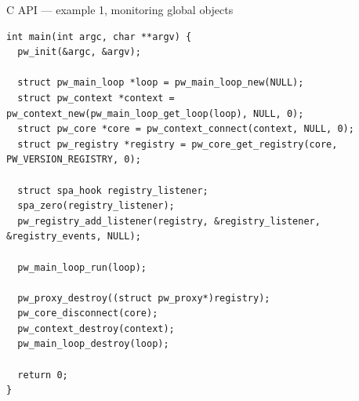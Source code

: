 \begin{frame}[fragile]{C API — example 1, monitoring global objects}
  \begin{block}{}
    \fontsize{8}{8}\selectfont
      \begin{verbatim}
int main(int argc, char **argv) {
  pw_init(&argc, &argv);

  struct pw_main_loop *loop = pw_main_loop_new(NULL);
  struct pw_context *context = pw_context_new(pw_main_loop_get_loop(loop), NULL, 0);
  struct pw_core *core = pw_context_connect(context, NULL, 0);
  struct pw_registry *registry = pw_core_get_registry(core, PW_VERSION_REGISTRY, 0);

  struct spa_hook registry_listener;
  spa_zero(registry_listener);
  pw_registry_add_listener(registry, &registry_listener, &registry_events, NULL);

  pw_main_loop_run(loop);

  pw_proxy_destroy((struct pw_proxy*)registry);
  pw_core_disconnect(core);
  pw_context_destroy(context);
  pw_main_loop_destroy(loop);

  return 0;
}
    \end{verbatim}
  \end{block}
\end{frame}



